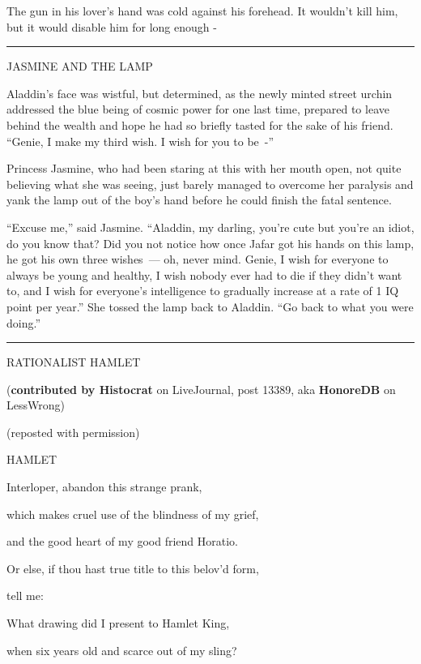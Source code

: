 The gun in his lover's hand was cold against his forehead. It wouldn't kill him, but it would disable him for long enough -

\begin{center}\rule{3in}{0.4pt}\end{center}

JASMINE AND THE LAMP

Aladdin's face was wistful, but determined, as the newly minted street urchin addressed the blue being of cosmic power for one last time, prepared to leave behind the wealth and hope he had so briefly tasted for the sake of his friend. ``Genie, I make my third wish. I wish for you to be~-''

Princess Jasmine, who had been staring at this with her mouth open, not quite believing what she was seeing, just barely managed to overcome her paralysis and yank the lamp out of the boy's hand before he could finish the fatal sentence.

``Excuse me,'' said Jasmine. ``Aladdin, my darling, you're cute but you're an idiot, do you know that? Did you not notice how once Jafar got his hands on this lamp, he got his own three wishes~--- oh, never mind. Genie, I wish for everyone to always be young and healthy, I wish nobody ever had to die if they didn't want to, and I wish for everyone's intelligence to gradually increase at a rate of 1 IQ point per year.'' She tossed the lamp back to Aladdin. ``Go back to what you were doing.''

\begin{center}\rule{3in}{0.4pt}\end{center}

RATIONALIST HAMLET

(\textbf{contributed by Histocrat} on LiveJournal, post 13389, aka \textbf{HonoreDB} on LessWrong)

(reposted with permission)

HAMLET

Interloper, abandon this strange prank,

which makes cruel use of the blindness of my grief,

and the good heart of my good friend Horatio.

Or else, if thou hast true title to this belov'd form,

tell me:

What drawing did I present to Hamlet King,

when six years old and scarce out of my sling?

